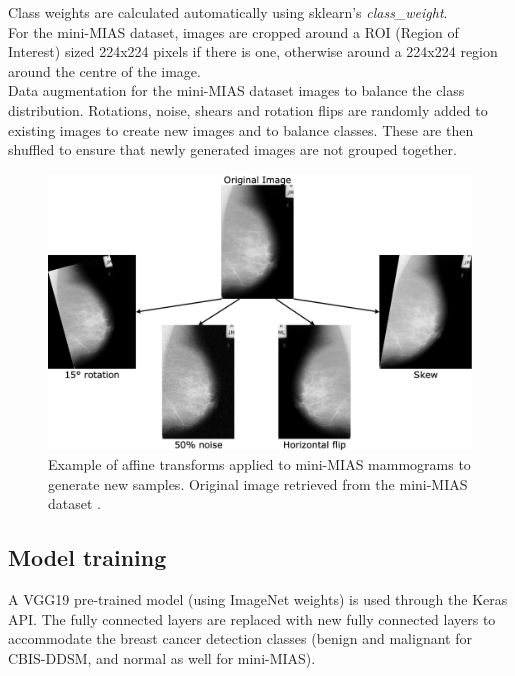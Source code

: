 Class weights are calculated automatically using sklearn's \textit{class\_weight}.\\

For the mini-MIAS dataset, images are cropped around a ROI (Region of Interest) sized 224x224 pixels if there is one, otherwise around a 224x224 region around the centre of the image.\\

Data augmentation for the mini-MIAS  dataset images to balance the class distribution. Rotations, noise, shears and rotation flips are randomly added to existing images to create new images and to balance classes. These are then shuffled to ensure that newly generated images are not grouped together.

\begin{figure}[ht]
\centerline{\includegraphics[width=\textwidth]{figures/implementation/Data augmentation transforms.png}}
\caption{\label{fig:implementation-Data augmentation transforms}Example of affine transforms applied to mini-MIAS mammograms to generate new samples. Original image retrieved from the mini-MIAS dataset \citep{Suckling1994}.}
\end{figure}


\subsection{Model training}

A VGG19 pre-trained model (using ImageNet weights) is used through the Keras API. The fully connected layers are replaced with new fully connected layers to accommodate the breast cancer detection classes (benign and malignant for CBIS-DDSM, and normal as well for mini-MIAS).\\

